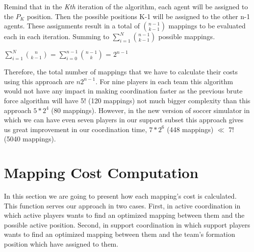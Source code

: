 Remind that in the \textit{Kth} iteration of the algorithm, each agent will be assigned to the $P_{K}$ position. Then the possible positions K-1 will be assigned to the other n-1 agents. These assignments result in a total of $ {{n-1}\choose{k-1}} $ mappings to be evaluated each in each iteration. Summing to $\sum\limits_{i=1}^N{{n-1}\choose{k-1}}$ possible mappings.\\
\begin{center}
$\sum\limits_{i=1}^N{{n}\choose{k-1}}$ = $\sum\limits_{i=0}^{n-1}{{n-1}\choose{k}}$ = $2^{n-1}$
\end{center}
Therefore, the total number of mappings that we have to calculate their costs using this approach are $n2^{n-1}$. For nine players in each team this algorithm would not have any impact in making coordination faster as the previous brute force algorithm will have 5! (120 mappings) not much bigger complexity than this approach $5 \ast 2^{4}$ (80 mappings). However, in the new version of soccer simulator in which we can have even seven players in our support subset this approach gives us great improvement in our coordination time, $7 \ast 2^{6}$ (448 mappings) $\ll$ 7! (5040 mappings).

\section{Mapping Cost Computation}
In this section we are going to present how each mapping's cost is calculated. This function serves our approach in two cases. First, in active coordination in which active players wants to find an optimized mapping between them and the possible active position. Second, in support coordination in which support players wants to find an optimized mapping between them and the team's formation position which have assigned to them.

